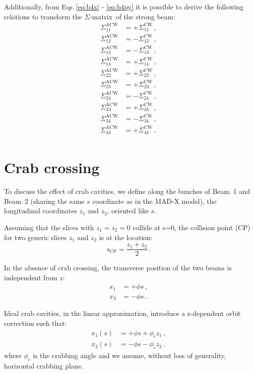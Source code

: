 Additionally, from Eqs.\,\eqref{eq:b4x} - \eqref{eq:b4py} it is possible to derive the following relations to transform the $\Sigma$-matrix\,\cite{bb6dnote} of the strong beam:
\begin{align}
    \Sigma_{11}^\text{ACW} &= +\Sigma_{11}^\text{CW} \, ,\\
    \Sigma_{12}^\text{ACW} &= -\Sigma_{12}^\text{CW} \, ,\\
    \Sigma_{13}^\text{ACW} &= -\Sigma_{13}^\text{CW} \, ,\\
    \Sigma_{14}^\text{ACW} &= +\Sigma_{14}^\text{CW} \, ,\\
    \Sigma_{22}^\text{ACW} &= +\Sigma_{22}^\text{CW} \, ,\\
    \Sigma_{23}^\text{ACW} &= +\Sigma_{23}^\text{CW} \, ,\\
    \Sigma_{24}^\text{ACW} &= -\Sigma_{24}^\text{CW} \, ,\\
    \Sigma_{33}^\text{ACW} &= +\Sigma_{33}^\text{CW} \, ,\\
    \Sigma_{34}^\text{ACW} &= -\Sigma_{34}^\text{CW} \, ,\\
    \Sigma_{44}^\text{ACW} &= +\Sigma_{44}^\text{CW} \, .\\
\end{align}



\section{Crab crossing}
\label{sec:crab}

To discuss the effect of crab cavities, we define along the bunches of Beam~1 and Beam~2 (sharing the same $s$ coordinate as in the MAD-X model), the longitudinal coordinates $z_1$ and $z_2$, oriented like $s$.

Assuming that the slices with $z_1 = z_2 = 0$ collide at s=0, the collision point (CP) for two generic slices $z_1$ and $z_2$ is at the location:
\begin{equation}
    s_\text{CP} = \frac{z_1 + z_2}{2} \, .
    \label{eq:cp}
\end{equation}

In the absence of crab crossing, the transverse position of the two beams is independent from $z$:
\begin{align}
    x_1 &= +\phi s \, ,\\
    x_2 &= -\phi s \, .
\end{align}

Ideal crab cavities, in the linear approximation, introduce a z-dependent orbit correction such that:
\begin{align}
    x_1(s) &= +\phi s + \phi_c z_1 \label{eq:x1} \, ,\\
    x_2(s) &= -\phi s - \phi_c z_2 \label{eq:x2} \, ,
\end{align}
where $\phi_c$ is the crabbing angle and we assume, without loss of generality, horizontal crabbing plane.

